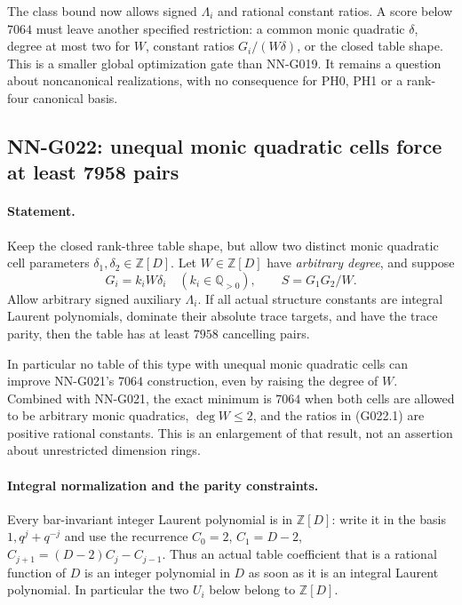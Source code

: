 The class bound now allows signed $\Lambda_i$ and rational
constant ratios. A score below $7064$ must leave another
specified restriction: a common monic quadratic $\delta$,
degree at most two for $W$, constant ratios $G_i/(W\delta)$,
or the closed table shape. This is a smaller global
optimization gate than NN-G019. It remains a question
about noncanonical realizations, with no consequence for
PH0, PH1 or a rank-four canonical basis.

\subsection{NN-G022: unequal monic quadratic cells force at least 7958 pairs}
\paragraph{Statement.}
Keep the closed rank-three table shape, but allow two distinct monic
quadratic cell parameters $\delta_1,\delta_2\in\mathbb Z[D]$.
Let $W\in\mathbb Z[D]$ have \emph{arbitrary degree}, and suppose
\[
 G_i=k_iW\delta_i\quad(k_i\in\mathbb Q_{>0}),\qquad
 S=G_1G_2/W.
 \tag{G022.1}
\]
Allow arbitrary signed auxiliary $\Lambda_i$. If all actual
structure constants are integral Laurent polynomials, dominate
their absolute trace targets, and have the trace parity, then
the table has at least $7958$ cancelling pairs.

In particular no table of this type with unequal monic quadratic
cells can improve NN-G021's $7064$ construction, even by raising
the degree of $W$. Combined with NN-G021, the exact minimum is
$7064$ when both cells are allowed to be arbitrary monic quadratics,
$\deg W\le2$, and the ratios in (G022.1) are positive rational
constants. This is an enlargement of that result, not an assertion
about unrestricted dimension rings.

\paragraph{Integral normalization and the parity constraints.}
Every bar-invariant integer Laurent polynomial is in $\mathbb Z[D]$:
write it in the basis $1,q^j+q^{-j}$ and use the recurrence
$C_0=2$, $C_1=D-2$, $C_{j+1}=(D-2)C_j-C_{j-1}$.
Thus an actual table coefficient that is a rational function of
$D$ is an integer polynomial in $D$ as soon as it is an integral
Laurent polynomial. In particular the two $U_i$ below belong
to $\mathbb Z[D]$.

